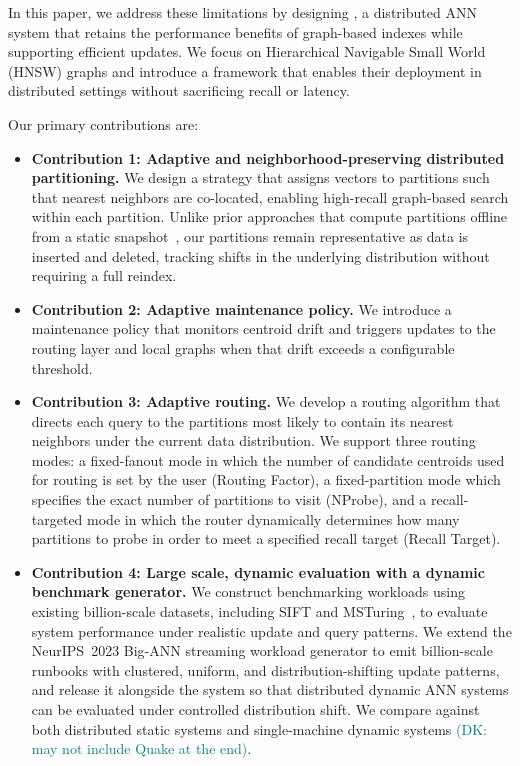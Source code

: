 \documentclass[sigconf,review,anonymous]{acmart}
\newcommand{\dk}[1]{\textcolor{teal}{(DK: #1)}}
\begin{document}
In this paper, we address these limitations by designing \SystemName{}, a distributed ANN system that retains the performance benefits of graph-based indexes while supporting efficient updates. We focus on Hierarchical Navigable Small World (HNSW) graphs and introduce a framework that enables their deployment in distributed settings without sacrificing recall or latency.

Our primary contributions are:
\begin{itemize}
    \item {\bf Contribution 1: Adaptive and neighborhood-preserving distributed partitioning.} We design a strategy that assigns vectors to partitions such that nearest neighbors are co-located, enabling high-recall graph-based search within each partition. Unlike prior approaches that compute partitions offline from a static snapshot~\cite{gottesbueren2025unleashing, deng2019pyramid, chen2021spann}, our partitions remain representative as data is inserted and deleted, tracking shifts in the underlying distribution without requiring a full reindex.

    \item {\bf Contribution 2: Adaptive maintenance policy.} We introduce a maintenance policy that monitors centroid drift and triggers updates to the routing layer and local graphs when that drift exceeds a configurable threshold.

    \item {\bf Contribution 3: Adaptive routing.} We develop a routing algorithm that directs each query to the partitions most likely to contain its nearest neighbors under the current data distribution. We support three routing modes: a fixed-fanout mode in which the number of candidate centroids used for routing is set by the user (Routing Factor), a fixed-partition mode which specifies the exact number of partitions to visit (NProbe), and a recall-targeted mode in which the router dynamically determines how many partitions to probe in order to meet a specified recall target (Recall Target).

    \item {\bf Contribution 4: Large scale, dynamic evaluation with a dynamic benchmark generator.} We construct benchmarking workloads using existing billion-scale datasets, including SIFT and MSTuring~\cite{simhadri2022results, simhadri2024results}, to evaluate system performance under realistic update and query patterns. We extend the NeurIPS~2023 Big-ANN streaming workload generator to emit billion-scale runbooks with clustered, uniform, and distribution-shifting update patterns, and release it alongside the system so that distributed dynamic ANN systems can be evaluated under controlled distribution shift. We compare against both distributed static systems and single-machine dynamic systems \dk{may not include Quake at the end}.


\end{itemize}
\end{document}
